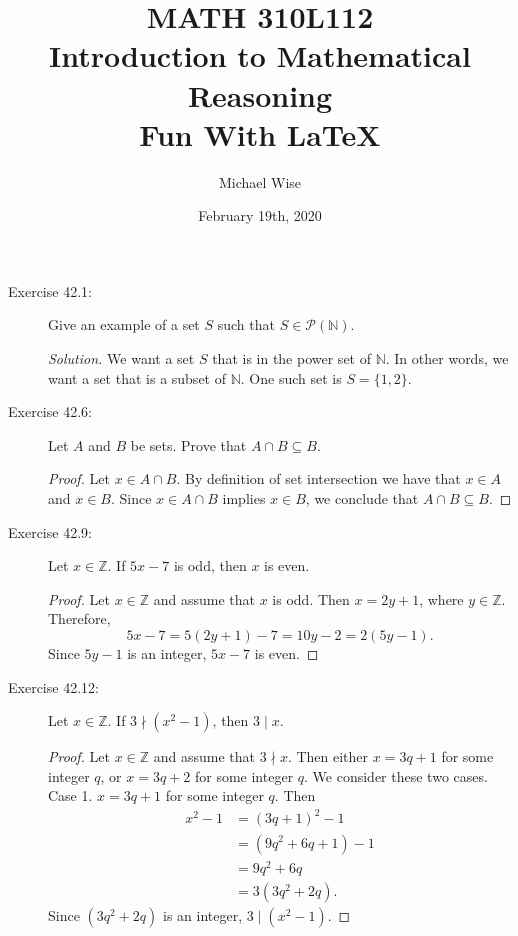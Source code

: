 \documentclass[12pt]{article}
\title{MATH 310L112\\
       Introduction to Mathematical Reasoning\\
       Fun With \LaTeX}
\author{Michael Wise}
\date{February 19th, 2020}
\begin{document}
\maketitle
\begin{description}

\item[Exercise 42.1:] Give an example of a set $S$ such that $S \in \mathcal{P}(\mathbb{N})$.

\begin{spacing}{2}
\textit{Solution.} We want a set $S$ that is in the power set of $\mathbb{N}$. In other words, we want a set that is a subset of $\mathbb{N}$. One such set is $S = \{1,2\}$.
\end{spacing}
  
\item[Exercise 42.6:] Let $A$ and $B$ be sets. Prove that $A \cap B \subseteq B$.

\begin{spacing}{2}
\begin{proof}
Let $ x \in A \cap B$. By definition of set intersection we have that $x \in A$ and $x \in B$. Since $x \in A \cap B$ implies $x \in B$, we conclude that $A \cap B \subseteq B$.
\end{proof}
\end{spacing} 

\item[Exercise 42.9:] Let $ x \in \mathbb{Z}$. If $5x - 7$ is odd, then $x$ is even.

\begin{spacing}{2}
\begin{proof}
Let $x \in \mathbb{Z}$ and assume that $x$ is odd. Then $x=2y+1$, where $y \in \mathbb{Z}$. Therefore, \[5x-7=5(2y+1)-7=10y-2=2(5y-1).\]
Since $5y-1$ is an integer, $5x-7$ is even.
\end{proof}
\end{spacing} 

\item[Exercise 42.12:] Let $ x \in \mathbb{Z}$. If $3 \nmid (x^2-1)$, then $3 \mid x$.

\begin{spacing}{2}
\begin{proof}
Let $x \in \mathbb{Z}$ and assume that $3 \nmid x$. Then either $x=3q+1$ for some integer $q$, or $x=3q+2$ for some integer $q$. We consider these two cases.
\newline
Case 1. $x=3q+1$ for some integer $q$. Then
\begin{align*}
x^2-1 &= (3q+1)^2-1 \\
&= (9q^2+6q+1)-1 \\
&= 9q^2+6q \\
&= 3(3q^2+2q).
\end{align*}
Since $(3q^2+2q)$ is an integer, $3 \mid (x^2-1)$.


\end{proof}
\end{spacing}
\end{description}
\end{document}
